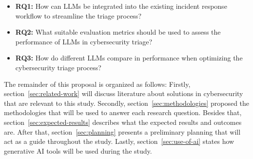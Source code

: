 \begin{itemize}
    \item \textbf{RQ1:} How can LLMs be integrated into the existing incident response workflow to streamline the triage process?
    \item \textbf{RQ2:} What suitable evaluation metrics should be used to assess the performance of LLMs in cybersecurity triage?
    \item \textbf{RQ3:} How do different LLMs compare in performance when optimizing the cybersecurity triage process?
\end{itemize}

The remainder of this proposal is organized as follows:
Firstly, section\ \ref{sec:related-work} will discuss literature about solutions in cybersecurity that are relevant to
this study.
Secondly, section\ \ref{sec:methodologies} proposed the methodologies that will be used to answer each research
question.
Besides that, section\ \ref{sec:expected-results} describes what the expected results and outcomes are.
After that, section\ \ref{sec:planning} presents a preliminary planning that will act as a guide throughout the study.
Lastly, section\ \ref{sec:use-of-ai} states how generative AI tools will be used during the study.
